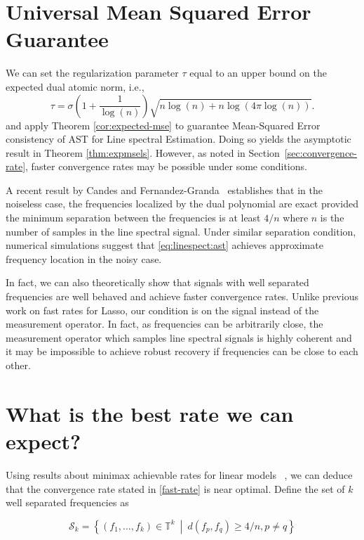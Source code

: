 \section{Universal Mean Squared Error Guarantee} %
\label{sec:universal-mse}

We can set the regularization parameter $\tau$ equal to an upper bound on the
expected dual atomic norm, i.e.,
\begin{equation}
\label{eq:tau}
\tau = \sigma\left(1  +  \frac{1}{\log(n)}\right)\sqrt{n \log(n) + n\log(4\pi\log(n))}.
\end{equation}
and apply Theorem \ref{cor:expected-mse} to guarantee Mean-Squared Error
consistency of AST for Line spectral Estimation. Doing so yields the asymptotic
result in Theorem \ref{thm:expmsels}. However, as noted in
Section~\ref{sec:convergence-rate}, faster convergence rates may be possible
under some conditions.

A recent result by Candes and Fernandez-Granda~\cite{CandesGranda} establishes
that in the noiseless case, the frequencies localized by the dual polynomial are
exact provided the minimum separation between the frequencies is at least $4/n$
where $n$ is the number of samples in the line spectral signal. Under similar
separation condition, numerical simulations suggest that \eqref{eq:linespect:ast} achieves
approximate frequency location in the noisy case.

In fact, we can also theoretically show that signals with well separated
frequencies are well behaved and achieve faster convergence rates. Unlike
previous work on fast rates for Lasso, our condition is on the signal instead of
the measurement operator. In fact, as frequencies can be arbitrarily close, the
measurement operator which samples line spectral signals is highly coherent and
it may be impossible to achieve robust recovery if frequencies can be close to
each other.



\section{What is the best rate we can expect?}\label{sec:minimax}

Using results about minimax achievable rates for linear models~
\cite{cd_minimax,rw_minimax}, we can deduce that the convergence rate stated in
\eqref{fast-rate} is near optimal. Define the set of $k$ well separated
frequencies as

\[
\mathcal{S}_k = \left\{(f_1, \dots, f_k) \in \mathbb{T}^k ~\middle|~  d(f_p, f_q) \geq 4/n, p \neq q \right\}
\]

